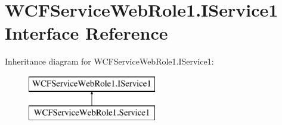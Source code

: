 \hypertarget{interface_w_c_f_service_web_role1_1_1_i_service1}{}\section{W\+C\+F\+Service\+Web\+Role1.\+I\+Service1 Interface Reference}
\label{interface_w_c_f_service_web_role1_1_1_i_service1}
Inheritance diagram for W\+C\+F\+Service\+Web\+Role1.\+I\+Service1\+:\begin{figure}[H]
\begin{center}
\leavevmode
\includegraphics[height=2.000000cm]{interface_w_c_f_service_web_role1_1_1_i_service1}
\end{center}
\end{figure}
